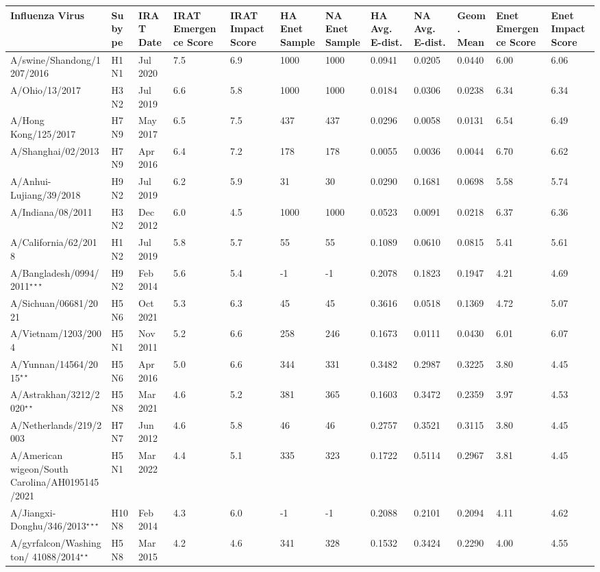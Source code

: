 \begin{tabular}{L{1.32in}|L{.35in}|L{.3in}|L{.3in}|L{.3in}|L{.35in}|L{.35in}|L{.35in}|L{.35in}|L{.32in}|L{.3in}|L{.3in}}\hline
Influenza Virus & Subype & IRAT Date &IRAT Emergence Score &IRAT Impact Score &HA Enet Sample &NA Enet Sample &HA Avg. E-dist. &NA Avg. E-dist. &Geom. Mean&Enet Emergence Score&Enet Impact Score \\\hline
 A/swine/Shandong/1207/2016 &H1N1& Jul  2020 &7.5&6.9&1000&1000&0.0941&0.0205&0.0440&6.00&6.06\\\hline
 A/Ohio/13/2017 &H3N2& Jul  2019 &6.6&5.8&1000&1000&0.0184&0.0306&0.0238&6.34&6.34\\\hline
 A/Hong  Kong/125/2017 &H7N9& May  2017 &6.5&7.5&437&437&0.0296&0.0058&0.0131&6.54&6.49\\\hline
 A/Shanghai/02/2013 &H7N9& Apr  2016 &6.4&7.2&178&178&0.0055&0.0036&0.0044&6.70&6.62\\\hline
 A/Anhui-Lujiang/39/2018 &H9N2& Jul  2019 &6.2&5.9&31&30&0.0290&0.1681&0.0698&5.58&5.74\\\hline
 A/Indiana/08/2011 &H3N2& Dec  2012 &6.0&4.5&1000&1000&0.0523&0.0091&0.0218&6.37&6.36\\\hline
 A/California/62/2018 &H1N2& Jul  2019 &5.8&5.7&55&55&0.1089&0.0610&0.0815&5.41&5.61\\\hline
 A/Bangladesh/0994/2011$^{\star\star\star}$ &H9N2& Feb  2014 &5.6&5.4&-1&-1&0.2078&0.1823&0.1947&4.21&4.69\\\hline
 A/Sichuan/06681/2021 &H5N6& Oct  2021 &5.3&6.3&45&45&0.3616&0.0518&0.1369&4.72&5.07\\\hline
 A/Vietnam/1203/2004 &H5N1& Nov  2011 &5.2&6.6&258&246&0.1673&0.0111&0.0430&6.01&6.07\\\hline
 A/Yunnan/14564/2015$^{\star\star}$ &H5N6& Apr  2016 &5.0&6.6&344&331&0.3482&0.2987&0.3225&3.80&4.45\\\hline
 A/Astrakhan/3212/2020$^{\star\star}$ &H5N8& Mar  2021 &4.6&5.2&381&365&0.1603&0.3472&0.2359&3.97&4.53\\\hline
 A/Netherlands/219/2003 &H7N7& Jun  2012 &4.6&5.8&46&46&0.2757&0.3521&0.3115&3.80&4.45\\\hline
 A/American  wigeon/South  Carolina/AH0195145/2021 &H5N1& Mar  2022 &4.4&5.1&335&323&0.1722&0.5114&0.2967&3.81&4.45\\\hline
 A/Jiangxi-Donghu/346/2013$^{\star\star\star}$ &H10N8& Feb  2014 &4.3&6.0&-1&-1&0.2088&0.2101&0.2094&4.11&4.62\\\hline
 A/gyrfalcon/Washington/ 41088/2014$^{\star\star}$ &H5N8& Mar  2015 &4.2&4.6&341&328&0.1532&0.3424&0.2290&4.00&4.55\\\hline

\end{tabular}
